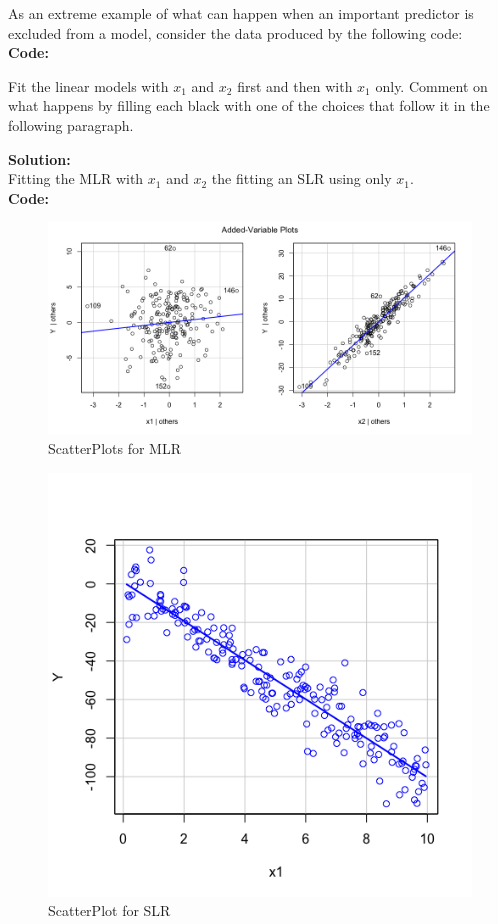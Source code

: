 \documentclass[12pt]{article}
\makeatletter
\theoremstyle{homework}
\newenvironment{exercise}[1]
{\def\@currentlabel{#1}\exercisecore}
{\endexercisecore}
\newcommand{\localhead}[1]{\par\smallskip\noindent\textbf{#1}\nobreak\\}%
\newcommand\solution{\localhead{Solution:}}
\makeatother
\begin{document}
\begin{exercise}{1} As an extreme example of what can happen when an important predictor is excluded from a model, 
  consider the data produced by the following code:\\
 \textbf{Code:}
 \begin{center}
 
 \end{center} 
 Fit the linear models with $x_1$ and $x_2$ first and then with $x_1$ only. Comment on what happens by filling 
 each black with one of the choices that follow it in the following paragraph. \\
\solution Fitting the MLR with $x_1$ and $x_2$ the fitting an SLR using only $x_1$. \\
\textbf{Code:}
\begin{center}

\end{center} 

\begin{figure}[H]
  \begin{center}
  \caption{ScatterPlots for MLR}
  \includegraphics[width = \textwidth]{Rplot01.png}
  \end{center}
\end{figure}
\begin{figure}[H]
  \begin{center}
  \caption{ScatterPlot for SLR}
  \includegraphics[width = .5\textwidth]{Rplot.png}
  \end{center}
\end{figure}




\end{exercise}
\end{document}
